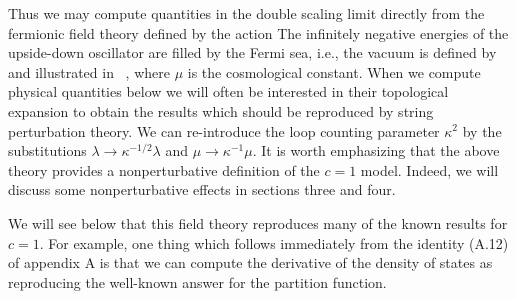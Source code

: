 Thus we may compute quantities in the double scaling limit
directly from the fermionic field theory defined by the 
action
\eqn{}
The infinitely negative energies of the upside-down oscillator are
filled by the Fermi sea, i.e., the vacuum is defined by
\eqn{}
and illustrated in \fig{}\ ,
where $\mu$ is the cosmological constant.
When we compute physical quantities below we will often 
be interested in their topological expansion to obtain 
the results which should be reproduced by string perturbation
theory. We can re-introduce the loop counting parameter $\kappa^2$
by the substitutions $\lambda\to\kappa^{-1/2}\lambda$ 
and $\mu\to\kappa^{-1}\mu$. It is worth emphasizing that the 
above theory provides a nonperturbative definition of the 
$c=1$ model.
Indeed, we will discuss some nonperturbative effects 
in sections three and four.

We will see below that this field theory reproduces many of the 
known results for $c=1$. For example, one thing which follows immediately 
from the identity (A.12) of appendix A is that we can compute
the derivative of the density of states as
\eqn{}
reproducing the well-known answer for the partition function. 


